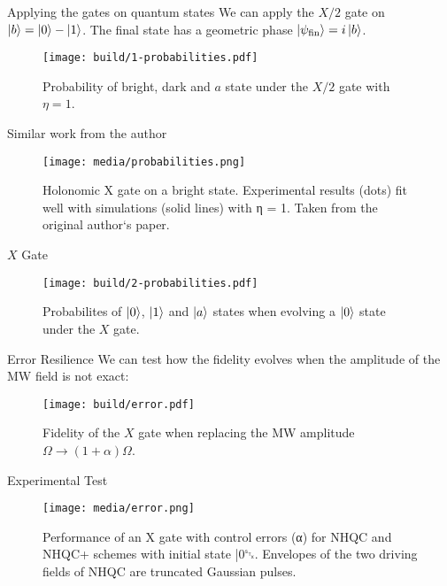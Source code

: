 \documentclass[aspectratio=1610, 9pt]{beamer}
\begin{document}
\begin{frame}{Applying the gates on quantum states}
  We can apply the $X/2$ gate on $\ket{b} = \ket{0} - \ket{1}$. The final state has a
  geometric phase $\ket{\psi_\text{fin}} = i \ket{b}$.
  \begin{figure}
    \centering
      \texttt{[image: build/1-probabilities.pdf]}
      \caption{Probability of bright, dark and $a$ state under the $X/2$ gate with $\eta=1$.}
  \end{figure}
\end{frame}

\begin{frame}{Similar work from the author}
  \begin{figure}
    \centering
      \texttt{[image: media/probabilities.png]}
      \caption{Holonomic X gate on a bright state. Experimental results
(dots) ﬁt well with simulations (solid lines) with η = 1. Taken from the original author`s paper.}
  \end{figure}
\end{frame}

\begin{frame}{$X$ Gate}
  \begin{figure}
    \centering
      \texttt{[image: build/2-probabilities.pdf]}
      \caption{Probabilites of $\ket{0}$, $\ket{1}$ and $\ket{a}$ states when evolving a $\ket{0}$
      state under the $X$ gate.}
  \end{figure}
\end{frame}

\begin{frame}{Error Resilience}
  We can test how the fidelity  evolves when the amplitude of the MW field is not exact:
  \begin{figure}
    \centering
      \texttt{[image: build/error.pdf]}
      \caption{Fidelity of the $X$ gate when replacing the MW amplitude $\Omega \rightarrow
      (1+\alpha)\Omega$.}
  \end{figure}
\end{frame}

\begin{frame}{Experimental Test}
  \begin{figure}
    \centering
      \texttt{[image: media/error.png]}
      \caption{Performance of an X gate with control errors (α) for NHQC and
NHQC+ schemes with initial state |0␂. Envelopes of the two
driving ﬁelds of NHQC are truncated Gaussian pulses. }
  \end{figure}
\end{frame}
\end{document}
